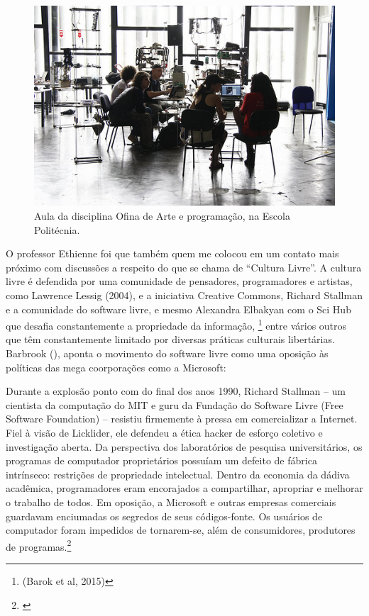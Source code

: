 \begin{figure}

\includegraphics[width=1\textwidth]{pictures/cap1/eti2}
\caption{Aula da disciplina Ofina de Arte e programação, na Escola Politécnia.}
\label{fig:eti2}
\end{figure}

O professor Ethienne foi que também quem me colocou em um contato mais próximo com discussões a respeito do que se chama de ``Cultura Livre''. A cultura livre é defendida por uma comunidade de pensadores, programadores e artistas, como Lawrence Lessig (2004), e a iniciativa Creative Commons, Richard Stallman e a comunidade do software livre, e mesmo Alexandra Elbakyan com o Sci Hub que desafia constantemente a propriedade da informação, \footnote{(Barok et al, 2015)} entre vários outros que têm constantemente limitado por diversas práticas culturais libertárias. Barbrook (\citeyear{Barbrook2009}), aponta o movimento do software livre como uma oposição às políticas das mega coorporações como a Microsoft:

\begin{citacao}
Durante a explosão ponto com do final dos anos 1990, Richard Stallman – um cientista da computação do MIT e guru da Fundação do Software Livre (Free Software Foundation) – resistiu firmemente à pressa em comercializar a Internet. Fiel à visão de Licklider, ele defendeu a ética hacker de esforço coletivo e investigação aberta. Da perspectiva dos laboratórios de pesquisa universitários, os programas de computador proprietários possuíam um defeito de fábrica intrínseco: restrições de propriedade intelectual. Dentro da economia da dádiva acadêmica, programadores eram encorajados a compartilhar, apropriar e melhorar o trabalho de todos. Em oposição, a Microsoft e outras empresas comerciais guardavam enciumadas os segredos de seus códigos-fonte. Os usuários de computador foram impedidos de tornarem-se, além de consumidores, produtores de programas.\footnote{\cite[367]{Barbrook2009}}
\end{citacao}

